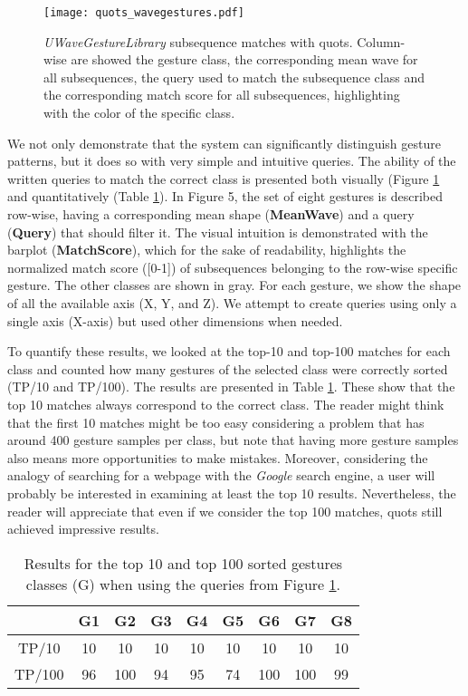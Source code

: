 \begin{figure}
\centering
\texttt{[image: quots\_wavegestures.pdf]}
\caption{\textit{UWaveGestureLibrary} subsequence matches with \gls{quots}. Column-wise are showed the gesture class, the corresponding mean wave for all subsequences, the query used to match the subsequence class and the corresponding match score for all subsequences, highlighting with the color of the specific class.}
\label{fig:quots_uwave}
\end{figure}

We not only demonstrate that the system can significantly distinguish gesture patterns, but it does so with very simple and intuitive queries. The ability of the written queries to match the correct class is presented both visually (Figure \ref{fig:quots_uwave} and quantitatively (Table \ref{tab:quots_exp1}). In Figure 5, the set of eight gestures is described row-wise, having a corresponding mean shape (\textbf{MeanWave}) and a query (\textbf{Query}) that should filter it. The visual intuition is demonstrated with the barplot (\textbf{MatchScore}), which for the sake of readability, highlights the normalized match score ([0-1]) of subsequences belonging to the row-wise specific gesture. The other classes are shown in gray. For each gesture, we show the shape of all the available axis (X, Y, and Z). We attempt to create queries using only a single axis (X-axis) but used other dimensions when needed.
\par
To quantify these results, we looked at the top-10 and top-100 matches for each class and counted how many gestures of the selected class were correctly sorted (TP/10 and TP/100). The results are presented in Table \ref{tab:quots_exp1}. These show that the top 10 matches always correspond to the correct class. The reader might think that the first 10 matches might be too easy considering a problem that has around 400 gesture samples per class, but note that having more gesture samples also means more opportunities to make mistakes. Moreover, considering the analogy of searching for a webpage with the \textit{Google} search engine, a user will probably be interested in examining at least the top 10 results. Nevertheless, the reader will appreciate that even if we consider the top 100 matches, \gls{quots} still achieved impressive results.

\begin{table}
\centering
\begin{tabular}{ccccccccc}
\toprule[1.5pt]
& G1 & G2 & G3 & G4 & G5 & G6 & G7 & G8\\
\midrule
TP/10 & 10 & 10 & 10 & 10 & 10 & 10 & 10 & 10\\
TP/100 & 96 & 100 & 94 & 95 & 74 & 100 & 100 & 99\\
\bottomrule[1.5pt]
\end{tabular}
\caption{Results for the top 10 and top 100 sorted gestures classes  (G) when using the queries from Figure \ref{fig:quots_uwave}.}
\label{tab:quots_exp1}
\end{table}

